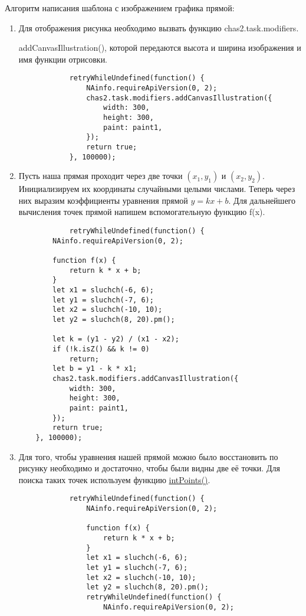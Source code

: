 Алгоритм написания шаблона с изображением графика прямой:
\begin{enumerate}
    \item Для отображения рисунка необходимо вызвать функцию chas2.task.modifiers.

          addCanvasIllustration(), которой передаются высота и ширина изображения и имя функции отрисовки.
          \begin{lstlisting}
            retryWhileUndefined(function() {
                NAinfo.requireApiVersion(0, 2);
                chas2.task.modifiers.addCanvasIllustration({
                    width: 300,
                    height: 300,
                    paint: paint1,
                });
                return true;
            }, 100000);         
    \end{lstlisting}
    \item Пусть наша прямая проходит через две точки $(x_1,y_1)$ и $(x_2,y_2)$. Инициализируем их координаты случайными целыми числами. Теперь через них выразим коэффициенты уравнения прямой $y=kx+b$.
          Для дальнейшего вычисления точек прямой напишем вспомогательную функцию f(x).
          \begin{lstlisting}
            retryWhileUndefined(function() {
    	NAinfo.requireApiVersion(0, 2);

    	function f(x) {
    		return k * x + b;
    	}
    	let x1 = sluchch(-6, 6);
    	let y1 = sluchch(-7, 6);
    	let x2 = sluchch(-10, 10);
    	let y2 = sluchch(8, 20).pm();

    	let k = (y1 - y2) / (x1 - x2);
    	if (!k.isZ() && k != 0)
    		return;
    	let b = y1 - k * x1;
    	chas2.task.modifiers.addCanvasIllustration({
    		width: 300,
    		height: 300,
    		paint: paint1,
    	});
    	return true;
    }, 100000);
           \end{lstlisting}
    \item Для того, чтобы уравнения нашей прямой можно было восстановить по рисунку необходимо и достаточно,
          чтобы были видны две её точки. Для поиска таких точек используем функцию \hyperlink{intPoints}{intPoints()}.
          \begin{lstlisting}
            retryWhileUndefined(function() {
                NAinfo.requireApiVersion(0, 2);
        
                function f(x) {
                    return k * x + b;
                }
                let x1 = sluchch(-6, 6);
                let y1 = sluchch(-7, 6);
                let x2 = sluchch(-10, 10);
                let y2 = sluchch(8, 20).pm();
                retryWhileUndefined(function() {
                    NAinfo.requireApiVersion(0, 2);
        

\end{lstlisting}
\end{enumerate}
